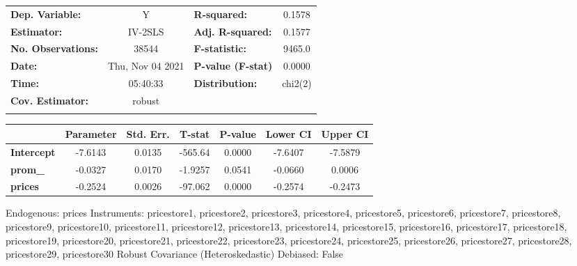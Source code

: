 \begin{center}
\begin{tabular}{lclc}
\toprule
\textbf{Dep. Variable:}    &         Y          & \textbf{  R-squared:         } &      0.1578      \\
\textbf{Estimator:}        &      IV-2SLS       & \textbf{  Adj. R-squared:    } &      0.1577      \\
\textbf{No. Observations:} &       38544        & \textbf{  F-statistic:       } &      9465.0      \\
\textbf{Date:}             &  Thu, Nov 04 2021  & \textbf{  P-value (F-stat)   } &      0.0000      \\
\textbf{Time:}             &      05:40:33      & \textbf{  Distribution:      } &     chi2(2)      \\
\textbf{Cov. Estimator:}   &       robust       & \textbf{                     } &                  \\
\textbf{}                  &                    & \textbf{                     } &                  \\
\bottomrule
\end{tabular}
\begin{tabular}{lcccccc}
                   & \textbf{Parameter} & \textbf{Std. Err.} & \textbf{T-stat} & \textbf{P-value} & \textbf{Lower CI} & \textbf{Upper CI}  \\
\midrule
\textbf{Intercept} &      -7.6143       &       0.0135       &     -565.64     &      0.0000      &      -7.6407      &      -7.5879       \\
\textbf{prom\_}    &      -0.0327       &       0.0170       &     -1.9257     &      0.0541      &      -0.0660      &       0.0006       \\
\textbf{prices}    &      -0.2524       &       0.0026       &     -97.062     &      0.0000      &      -0.2574      &      -0.2473       \\
\bottomrule
\end{tabular}
\end{center}

Endogenous: prices \newline
 Instruments: pricestore1, pricestore2, pricestore3, pricestore4, pricestore5, pricestore6, pricestore7, pricestore8, pricestore9, pricestore10, pricestore11, pricestore12, pricestore13, pricestore14, pricestore15, pricestore16, pricestore17, pricestore18, pricestore19, pricestore20, pricestore21, pricestore22, pricestore23, pricestore24, pricestore25, pricestore26, pricestore27, pricestore28, pricestore29, pricestore30 \newline
 Robust Covariance (Heteroskedastic) \newline
 Debiased: False

